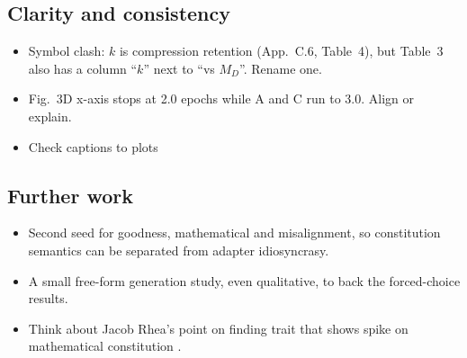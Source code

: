 \documentclass{article}
\begin{document}
\subsection*{Clarity and consistency}
\begin{itemize}
  \item Symbol clash: $k$ is compression retention (App.~C.6, Table~4), but Table~3 also has a column ``$k$'' next to ``vs $M_D$''. Rename one.
  \item Fig.~3D x-axis stops at 2.0 epochs while A and C run to 3.0. Align or explain.
  \item Check captions to plots
\end{itemize}

\subsection*{Further work}
\begin{itemize}
  \item Second seed for goodness, mathematical and misalignment, so constitution semantics can be separated from adapter idiosyncrasy.
  \item A small free-form generation study, even qualitative, to back the forced-choice results.
  \item Think about Jacob Rhea's point on finding trait that shows spike on mathematical constitution .
\end{itemize}
\clearpage
\setcounter{page}{1}
\fi

\maketitle
\end{document}
